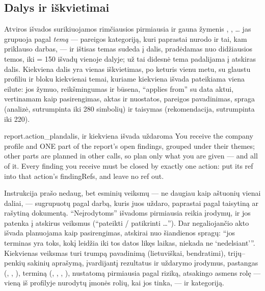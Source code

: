 \subsection{Dalys ir iškvietimai}

Atviros išvados surikiuojamos rimčiausios pirmiausia ir gauna žymenis , ,
\ldots{}  jas grupuoja pagal \emph{temą} --- pareigos kategoriją, kuri paprastai
nurodo ir tai, kam priklauso darbas, --- ir ištisas temas sudeda į dalis, pradėdamas nuo
didžiausios temos, iki  = 150 išvadų vienoje dalyje; už tai
didesnė tema padalijama į atskiras dalis. Kiekviena dalis yra vienas iškvietimas, po keturis
vienu metu, su glaustu profiliu ir bloku kiekvienai temai, kuriame kiekviena išvada pateikiama
viena eilute: jos žymuo, reikšmingumas ir būsena, \enquote{applies from} su data aktui,
vertinamam kaip pasirengimas, aktas ir nuostatos, pareigos pavadinimas, spraga (analizė,
sutrumpinta iki 280 simbolių) ir taisymas (rekomendacija, sutrumpinta iki 220).

\begin{promptexcerpt}{report.action_plan}{dalis, ir kiekviena išvada uždaroma}
  You receive the company profile and ONE part of the report's open findings, grouped
  under their themes; other parts are planned in other calls, so plan only what you
  are given — and all of it. Every finding you receive must be closed by exactly one
  action: put its ref into that action's findingRefs, and leave no ref out.
\end{promptexcerpt}

Instrukcija prašo nedaug, bet esminių veiksmų --- ne daugiau kaip aštuonių vienai daliai, ---
sugrupuotų pagal darbą, kuris juos uždaro, paprastai pagal taisytiną ar rašytiną dokumentą.
\enquote{Neįrodytoms} išvadoms pirmiausia reikia įrodymų, ir jos patenka į atskirus veiksmus
(\enquote{pateikti / patikrinti \ldots}). Dar negaliojančio akto išvada planuojama kaip
pasirengimas, atskirai nuo šiandienos spragų: \enquote{jos terminas yra toks, kokį leidžia iki tos
datos likęs laikas, niekada ne \enquote{nedelsiant}}. Kiekvienas veiksmas turi trumpą pavadinimą
(lietuviškai, bendratimi), trijų--penkių sakinių aprašymą, įvardijantį rezultatus ir uždarymo
įrodymus, pastangas (, , ), terminą (,
, , ), nustatomą pirmiausia pagal riziką, atsakingo
asmens rolę --- vieną iš profilyje nurodytų įmonės rolių, kai jos tinka, --- ir kategoriją.

